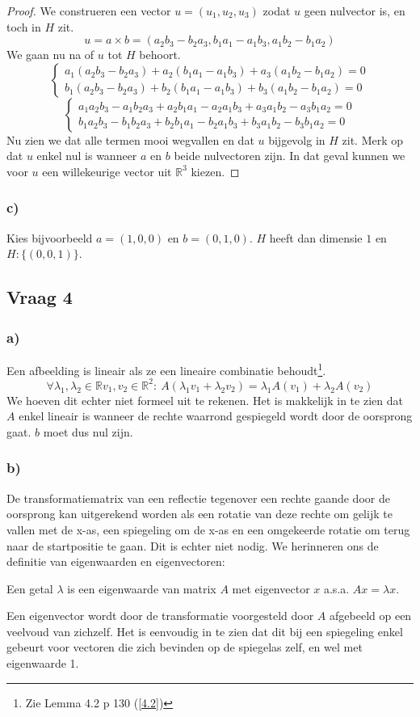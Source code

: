 \documentclass[lineaire_algebra_oplossingen.tex]{subfiles}
\begin{document}
\begin{proof}
We construeren een vector $u = (u_1,u_2,u_3)$ zodat $u$ geen nulvector is, en toch in $H$ zit.
\[
u = a \times b =
(a_2b_3-b_2a_3, b_1a_1-a_1b_3, a_1b_2-b_1a_2)
\]
We gaan nu na of $u$ tot $H$ behoort.
\[
\left\{
\begin{array}{c}
a_1(a_2b_3-b_2a_3) + a_2(b_1a_1-a_1b_3) + a_3(a_1b_2-b_1a_2) = 0\\
b_1(a_2b_3-b_2a_3) + b_2(b_1a_1-a_1b_3) + b_3(a_1b_2-b_1a_2) = 0
\end{array}
\right.
\]
\[
\left\{
\begin{array}{c}
a_1a_2b_3-a_1b_2a_3 + a_2b_1a_1-a_2a_1b_3 + a_3a_1b_2-a_3b_1a_2 = 0\\
b_1a_2b_3-b_1b_2a_3 + b_2b_1a_1-b_2a_1b_3 + b_3a_1b_2-b_3b_1a_2 = 0
\end{array}
\right.
\]
Nu zien we dat alle termen mooi wegvallen en dat $u$ bijgevolg in $H$ zit. Merk op dat $u$ enkel nul is wanneer $a$ en $b$ beide nulvectoren zijn. In dat geval kunnen we voor $u$ een willekeurige vector uit $\mathbb{R}^3$ kiezen.
\end{proof}

\subsubsection*{c)}
Kies bijvoorbeeld $a= (1,0,0)$ en $b=(0,1,0)$. $H$ heeft dan dimensie $1$ en $H : \{(0,0,1)\}$.

\subsection{Vraag 4}
\subsubsection*{a)}
Een afbeelding is lineair als ze een lineaire combinatie behoudt\footnote{Zie Lemma 4.2 p 130 (\ref{4.2})}.
\[
\forall \lambda_1,\lambda_2 \in \mathbb{R} v_1,v_2 \in \mathbb{R}^{2}:\  A(\lambda_1v_1+\lambda_2v_2) = \lambda_1A(v_1)+\lambda_2A(v_2)
\]
We hoeven dit echter niet formeel uit te rekenen. Het is makkelijk in te zien dat $A$ enkel lineair is wanneer de rechte waarrond gespiegeld wordt door de oorsprong gaat. $b$ moet dus nul zijn.

\subsubsection*{b)}
De transformatiematrix van een reflectie tegenover een rechte gaande door de oorsprong kan uitgerekend worden als een rotatie van deze rechte om gelijk te vallen met de x-as, een spiegeling om de x-as en een omgekeerde rotatie om terug naar de startpositie te gaan. Dit is echter niet nodig. We herinneren ons de definitie van eigenwaarden en eigenvectoren:
\begin{center}
Een getal $\lambda$ is een eigenwaarde van matrix $A$ met eigenvector $x$ a.s.a. $Ax = \lambda x$.
\end{center}
Een eigenvector wordt door de transformatie voorgesteld door $A$ afgebeeld op een veelvoud van zichzelf. Het is eenvoudig in te zien dat dit bij een spiegeling enkel gebeurt voor vectoren die zich bevinden op de spiegelas zelf, en wel met eigenwaarde 1.
\end{document}
